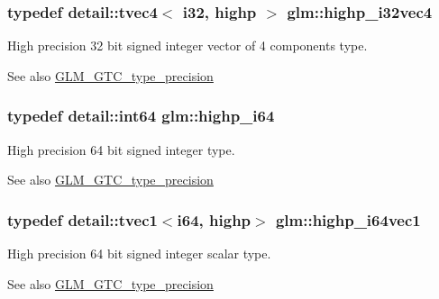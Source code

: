 \subsubsection[{\texorpdfstring{highp\+\_\+i32vec4}{highp_i32vec4}}]{\setlength{\rightskip}{0pt plus 5cm}typedef detail\+::tvec4$<$ i32, highp $>$ {\bf glm\+::highp\+\_\+i32vec4}}\hypertarget{group__gtc__type__precision_ga174af0fafdc5a9eb24150792bffa8b5c}{}\label{group__gtc__type__precision_ga174af0fafdc5a9eb24150792bffa8b5c}
High precision 32 bit signed integer vector of 4 components type. \begin{DoxySeeAlso}{See also}
\hyperlink{group__gtc__type__precision}{G\+L\+M\+\_\+\+G\+T\+C\+\_\+type\+\_\+precision} 
\end{DoxySeeAlso}
\subsubsection[{\texorpdfstring{highp\+\_\+i64}{highp_i64}}]{\setlength{\rightskip}{0pt plus 5cm}typedef detail\+::int64 {\bf glm\+::highp\+\_\+i64}}\hypertarget{group__gtc__type__precision_gad3cb9a0ac0266ea2c51c6fac256345d1}{}\label{group__gtc__type__precision_gad3cb9a0ac0266ea2c51c6fac256345d1}
High precision 64 bit signed integer type. \begin{DoxySeeAlso}{See also}
\hyperlink{group__gtc__type__precision}{G\+L\+M\+\_\+\+G\+T\+C\+\_\+type\+\_\+precision} 
\end{DoxySeeAlso}
\subsubsection[{\texorpdfstring{highp\+\_\+i64vec1}{highp_i64vec1}}]{\setlength{\rightskip}{0pt plus 5cm}typedef detail\+::tvec1$<$i64, highp$>$ {\bf glm\+::highp\+\_\+i64vec1}}\hypertarget{group__gtc__type__precision_ga06c21aba992669f5c160ec5f5a480522}{}\label{group__gtc__type__precision_ga06c21aba992669f5c160ec5f5a480522}
High precision 64 bit signed integer scalar type. \begin{DoxySeeAlso}{See also}
\hyperlink{group__gtc__type__precision}{G\+L\+M\+\_\+\+G\+T\+C\+\_\+type\+\_\+precision} 
\end{DoxySeeAlso}
